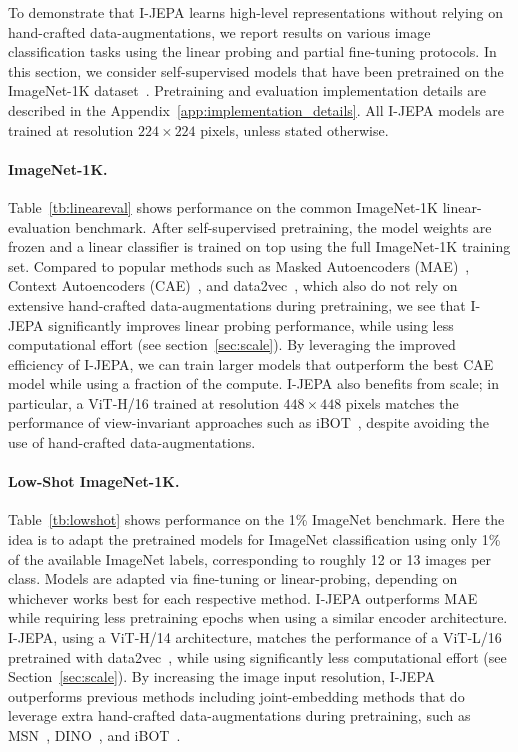 \documentclass[10pt,twocolumn,letterpaper]{article}
\newcommand{\putalg}{{I-JEPA}\xspace}
\begin{document}
To demonstrate that \putalg learns high-level representations without relying on hand-crafted data-augmentations, we report results on various image classification tasks using the linear probing and partial fine-tuning protocols.
In this section, we consider self-supervised models that have been pretrained on the ImageNet-1K dataset~\cite{russakovsky2015imagenet}.
Pretraining and evaluation implementation details are described in the Appendix~\ref{app:implementation_details}.
All \putalg models are trained at resolution $224 \times 224$ pixels, unless stated otherwise.

\paragraph{ImageNet-1K.}
Table~\ref{tb:lineareval} shows performance on the common ImageNet-1K linear-evaluation benchmark.
After self-supervised pretraining, the model weights are frozen and a linear classifier is trained on top using the full ImageNet-1K training set.
Compared to popular methods such as Masked Autoencoders (MAE)~\cite{he2021masked}, Context Autoencoders (CAE)~\cite{chen2022context}, and data2vec~\cite{baevski2022data2vec}, which also do not rely on extensive hand-crafted data-augmentations during pretraining, we see that \putalg significantly improves linear probing performance, while using less computational effort (see section~\ref{sec:scale}).
By leveraging the improved efficiency of \putalg, we can train larger models that outperform the best CAE model while using a fraction of the compute.
\putalg also benefits from scale; in particular, a ViT-H/16 trained at resolution $448 \times 448$ pixels matches the performance of view-invariant approaches such as iBOT~\cite{zhou2021ibotyes}, despite avoiding the use of hand-crafted data-augmentations.

\paragraph{Low-Shot ImageNet-1K.}
Table~\ref{tb:lowshot} shows performance on the 1\% ImageNet benchmark.
Here the idea is to adapt the pretrained models for ImageNet classification using only 1\% of the available ImageNet labels, corresponding to roughly 12 or 13 images per class.
Models are adapted via fine-tuning or linear-probing, depending on whichever works best for each respective method.
\putalg outperforms MAE while requiring less pretraining epochs when using a similar encoder architecture.
\putalg, using a ViT-H/14 architecture,  matches the performance of a ViT-L/16 pretrained with data2vec~\cite{baevski2022data2vec}, while using significantly less computational effort (see Section~\ref{sec:scale}).
By increasing the image input resolution, \putalg outperforms previous methods including joint-embedding methods that do leverage extra hand-crafted data-augmentations during pretraining, such as MSN~\cite{assran2022masked}, DINO~\cite{caron2020unsupervised}, and iBOT~\cite{zhou2021ibotyes}.
\end{document}
